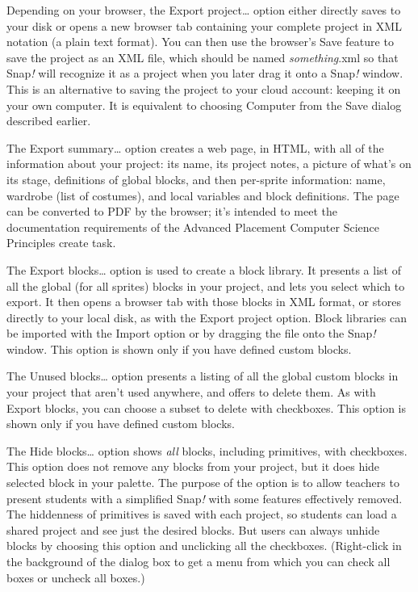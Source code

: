 Depending on your browser, the Export project\ldots{} option either
directly saves to your disk or opens a new browser tab containing your
complete project in XML notation (a plain text format). You can then use
the browser's Save feature to save the project as an XML file, which
should be named \emph{something}.xml so that Snap\emph{!} will recognize
it as a project when you later drag it onto a Snap\emph{!} window. This
is an alternative to saving the project to your cloud account: keeping
it on your own computer. It is equivalent to choosing Computer from the
Save dialog described earlier.

The Export summary\ldots{} option creates a web page, in HTML, with all
of the information about your project: its name, its project notes, a
picture of what's on its stage, definitions of global blocks, and then
per-sprite information: name, wardrobe (list of costumes), and local
variables and block definitions. The page can be converted to PDF by the
browser; it's intended to meet the documentation requirements of the
Advanced Placement Computer Science Principles create task.

The Export blocks\ldots{} option is used to create a block library. It
presents a list of all the global (for all sprites) blocks in your
project, and lets you select which to export. It then opens a browser
tab with those blocks in XML format, or stores directly to your local
disk, as with the Export project option. Block libraries can be imported
with the Import option or by dragging the file onto the Snap\emph{!}
window. This option is shown only if you have defined custom blocks.

The Unused blocks\ldots{} option presents a listing of all the global
custom blocks in your project that aren't used anywhere, and offers to
delete them. As with Export blocks, you can choose a subset to delete
with checkboxes. This option is shown only if you have defined custom
blocks.

The Hide blocks\ldots{} option shows \emph{all} blocks, including
primitives, with checkboxes. This option does not remove any blocks from
your project, but it does hide selected block in your palette. The
purpose of the option is to allow teachers to present students with a
simplified Snap\emph{!} with some features effectively removed. The
hiddenness of primitives is saved with each project, so students can
load a shared project and see just the desired blocks. But users can
always unhide blocks by choosing this option and unclicking all the
checkboxes. (Right-click in the background of the dialog box to get a
menu from which you can check all boxes or uncheck all boxes.)

